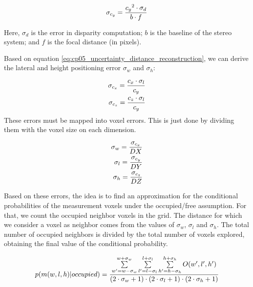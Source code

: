 \begin{equation}\label{eq:cp05_uncertainty_distance_reconstruction}
\sigma_{c_y}={{{c_y}^2 \cdot \sigma_d} \over {b \cdot f}}
\end{equation}

Here, $\sigma_d$ is the error in disparity computation; $b$ is the baseline of the stereo system; and $f$ is the focal distance (in pixels).

Based on equation \ref{eq:cp05_uncertainty_distance_reconstruction}, we can derive the lateral and height positioning error $\sigma_w$ and $\sigma_h$:

\begin{equation}\label{eq:cp05_uncertainty_lateral_and_height_reconstruction}
\begin{align}
\sigma_{c_x}={{{c_x} \cdot \sigma_l} \over {c_y}} \\
\sigma_{c_z}={{{c_z} \cdot \sigma_l} \over {c_y}}
\end{align}
\end{equation}
These errors must be mapped into voxel errors. This is just done by dividing them with the voxel size on each dimension.

\begin{equation}\label{eq:cp05_uncertainty_voxel_errors}
\begin{align}
\sigma_w={{\sigma_{c_x}} \over {DX}} \\
\sigma_l={{\sigma_{c_y}} \over {DY}} \\
\sigma_h={{\sigma_{c_z}} \over {DZ}}
\end{align}
\end{equation}

Based on these errors, the idea is to find an approximation for the conditional probabilities of the measurement voxels under the occupied/free assumption. For that, we count the occupied neighbor voxels in the grid. The distance for which we consider a voxel as neighbor comes from the values of $\sigma_w$, $\sigma_l$ and $\sigma_h$. The total number of occupied neighbors is divided by the total number of voxels explored, obtaining the final value of the conditional probability.

\begin{equation}\label{eq:cp05_conditional_prob}
p(m(w,l,h)|occupied) = {
{\sum \limits_{w'=w-\sigma_w}^{w+\sigma_w} \sum \limits_{l'=l-\sigma_l}^{l+\sigma_l} \sum \limits_{h'=h-\sigma_h}^{h+\sigma_h} O(w',l',h')} 
\over 
{(2 \cdot \sigma_w + 1) \cdot (2 \cdot \sigma_l + 1) \cdot (2 \cdot \sigma_h + 1)}}
\end{equation}

